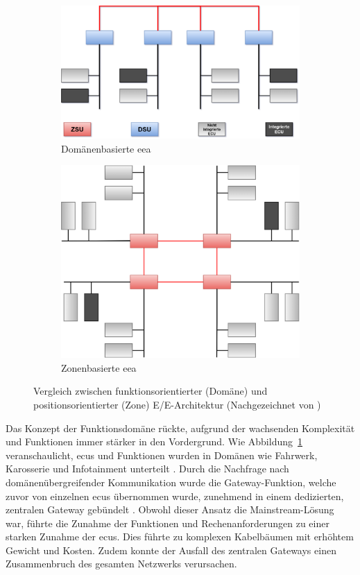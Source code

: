 \begin{figure}[h!]
  \centering
  \begin{subfigure}{.5\textwidth}
    \centering
    \includegraphics[width=\linewidth]{figures/02Grundlagen/Domainbasiert.drawio.png}
    \caption{Domänenbasierte \gls{eea}}
    \label{fig:deea}
  \end{subfigure}%
  \begin{subfigure}{.5\textwidth}
    \centering
    \includegraphics[width=.75\linewidth]{figures/02Grundlagen/Zonenbasiert.drawio.png}
    \caption{Zonenbasierte \gls{eea}}
    \label{fig:zeea}
  \end{subfigure}
  \caption{Vergleich zwischen funktionsorientierter (Domäne) und positionsorientierter (Zone) E/E-Architektur (Nachgezeichnet von \cite{wang2024review})}
  \label{fig:eea}
\end{figure}


Das Konzept der Funktionsdomäne rückte, aufgrund der wachsenden Komplexität und Funktionen immer stärker in den Vordergrund. Wie Abbildung~\ref{fig:deea} veranschaulicht, \glspl{ecu} und Funktionen wurden in Domänen wie Fahrwerk, Karosserie und Infotainment unterteilt \cite{jiang2019vehicle}. Durch die Nachfrage nach domänenübergreifender Kommunikation wurde die Gateway-Funktion, welche zuvor von einzelnen \glspl{ecu} übernommen wurde, zunehmend in einem dedizierten, zentralen Gateway gebündelt \cite{jiang2019vehicle}\cite{zhuRequirementsDrivenAutomotiveElectrical2021}.
Obwohl dieser Ansatz die Mainstream-Lösung war, führte die Zunahme der Funktionen und Rechenanforderungen zu einer starken Zunahme der \glspl{ecu}. Dies führte zu komplexen Kabelbäumen mit erhöhtem Gewicht und Kosten. Zudem konnte der Ausfall des zentralen Gateways einen Zusammenbruch des gesamten Netzwerks verursachen.

